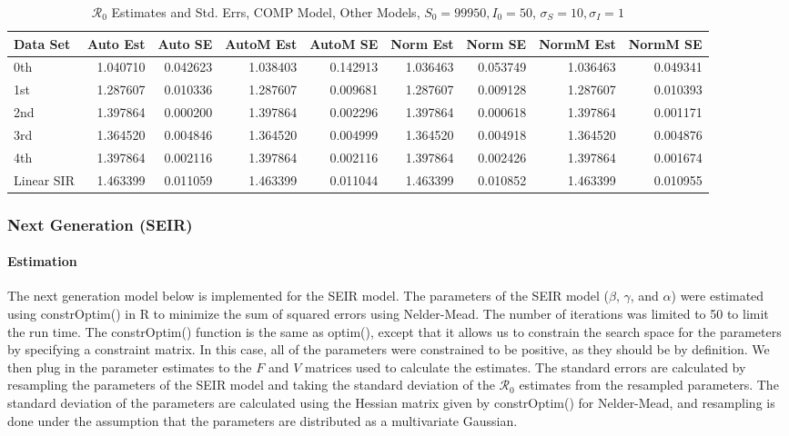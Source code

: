 \documentclass[12pt]{article}
\newcommand{\rr}{\ensuremath{\mathcal{R}_0}}
\begin{document}
\begin{table}[H]
	
	\caption{$\rr$ Estimates and Std. Errs, COMP Model,
		Other Models, $S_0 = 99950, I_0 = 50$, 
		$\sigma_S = 10, \sigma_I = 1$}
	\begin{footnotesize}
		\hskip -1cm
	\begin{tabular}{l|r|r|r|r|r|r|r|r}
		\hline
		Data Set & Auto Est & Auto SE & AutoM Est & AutoM SE & Norm Est & Norm SE & NormM Est & NormM SE\\
		\hline
		0th & 1.040710 & 0.042623 & 1.038403 & 0.142913 & 1.036463 & 0.053749 & 1.036463 & 0.049341\\
		\hline
		1st & 1.287607 & 0.010336 & 1.287607 & 0.009681 & 1.287607 & 0.009128 & 1.287607 & 0.010393\\
		\hline
		2nd & 1.397864 & 0.000200 & 1.397864 & 0.002296 & 1.397864 & 0.000618 & 1.397864 & 0.001171\\
		\hline
		3rd & 1.364520 & 0.004846 & 1.364520 & 0.004999 & 1.364520 & 0.004918 & 1.364520 & 0.004876\\
		\hline
		4th & 1.397864 & 0.002116 & 1.397864 & 0.002116 & 1.397864 & 0.002426 & 1.397864 & 0.001674\\
		\hline
		Linear SIR & 1.463399 & 0.011059 & 1.463399 & 0.011044 & 1.463399 & 0.010852 & 1.463399 & 0.010955\\
		\hline
	\end{tabular}
\end{footnotesize}
\end{table}

\subsubsection{Next Generation (SEIR)}

\paragraph{Estimation}

The next generation model below is implemented for the SEIR model. The parameters of the SEIR model ($\beta$, $\gamma$, and $\alpha$) were estimated using constrOptim() in R to minimize the sum of squared errors using Nelder-Mead. The number of iterations was limited to 50 to limit the run time. The constrOptim() function is the same as optim(), except that it allows us to constrain the search space for the parameters by specifying a constraint matrix. In this case, all of the parameters were constrained to be positive, as they should be by definition. We then plug in the parameter estimates to the $F$ and $V$ matrices used to calculate the estimates. The standard errors are calculated by resampling the parameters of the SEIR model and taking the standard deviation of the $\rr$ estimates from the resampled parameters. The standard deviation of the parameters are calculated using the Hessian matrix given by constrOptim() for Nelder-Mead, and resampling is done under the assumption that the parameters are distributed as a multivariate Gaussian.
\end{document}
